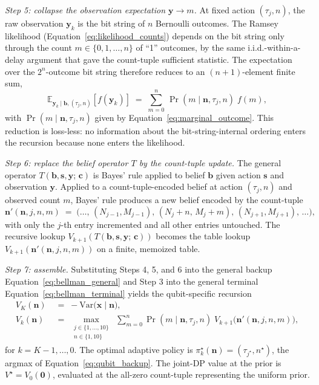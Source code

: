 \documentclass[11pt]{article}
\newcommand{\bc}{\bm{c}}
\newcommand{\bx}{\bm{x}}
\newcommand{\by}{\bm{y}}
\newcommand{\bs}{\bm{s}}
\newcommand{\bb}{\bm{b}}
\newcommand{\E}{\mathbb{E}}
\begin{document}
\textit{Step 5: collapse the observation expectation $\by \to m$.}  At fixed action $(\tau_j, n)$, the raw observation $\by_k$ is the bit string of $n$ Bernoulli outcomes.  The Ramsey likelihood (Equation~\eqref{eq:likelihood_counts}) depends on the bit string only through the count $m \in \{0, 1, \ldots, n\}$ of ``1'' outcomes, by the same i.i.d.-within-a-delay argument that gave the count-tuple sufficient statistic.  The expectation over the $2^n$-outcome bit string therefore reduces to an $(n+1)$-element finite sum,
\begin{equation*}
\E_{\by_k \mid \bb, (\tau_j, n)}[f(\by_k)] \;=\; \sum_{m=0}^{n}\, \Pr(m \mid \mathbf{n}, \tau_j, n)\; f(m),
\end{equation*}
with $\Pr(m \mid \mathbf{n}, \tau_j, n)$ given by Equation~\eqref{eq:marginal_outcome}.  This reduction is loss-less: no information about the bit-string-internal ordering enters the recursion because none enters the likelihood.

\textit{Step 6: replace the belief operator $T$ by the count-tuple update.}  The general operator $T(\bb, \bs, \by;\, \bc)$ is Bayes' rule applied to belief $\bb$ given action $\bs$ and observation $\by$.  Applied to a count-tuple-encoded belief at action $(\tau_j, n)$ and observed count $m$, Bayes' rule produces a new belief encoded by the count-tuple
\begin{equation*}
\mathbf{n}'(\mathbf{n}, j, n, m) \;=\; \bigl(\ldots,\, (N_{j-1}, M_{j-1}),\, (N_j + n,\, M_j + m),\, (N_{j+1}, M_{j+1}),\, \ldots\bigr),
\end{equation*}
with only the $j$-th entry incremented and all other entries untouched.  The recursive lookup $V_{k+1}(T(\bb, \bs, \by;\, \bc))$ becomes the table lookup $V_{k+1}(\mathbf{n}'(\mathbf{n}, j, n, m))$ on a finite, memoized table.

\textit{Step 7: assemble.}  Substituting Steps 4, 5, and 6 into the general backup Equation~\eqref{eq:bellman_general} and Step 3 into the general terminal Equation~\eqref{eq:bellman_terminal} yields the qubit-specific recursion
\begin{align}
V_K(\mathbf{n}) &\;=\; -\mathrm{Var}\bigl(\bx \mid \mathbf{n}\bigr), \label{eq:qubit_terminal}\\
V_k(\mathbf{n}) &\;=\; \max_{\substack{j \in \{1, \ldots, 10\}\\ n \in \{1, 10\}}}\;
\sum_{m = 0}^{n}
\Pr(m \mid \mathbf{n}, \tau_j, n)\; V_{k+1}\bigl(\mathbf{n}'(\mathbf{n}, j, n, m)\bigr),
\label{eq:qubit_backup}
\end{align}
for $k = K - 1, \ldots, 0$.  The optimal adaptive policy is $\pi^\star_k(\mathbf{n}) = (\tau_{j^\star}, n^\star)$, the argmax of Equation~\eqref{eq:qubit_backup}.  The joint-DP value at the prior is $V^\star = V_0(\mathbf{0})$, evaluated at the all-zero count-tuple representing the uniform prior.
\end{document}
